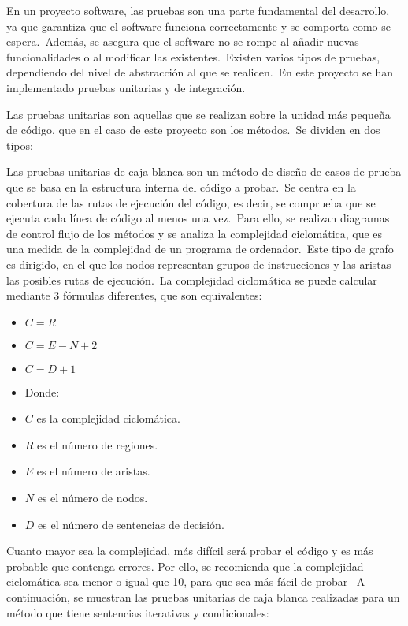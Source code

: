 
En un proyecto software, las pruebas son una parte fundamental del desarrollo, ya que garantiza que el software funciona
correctamente y se comporta como se espera.\ Además, se asegura que el software no se rompe al añadir nuevas
funcionalidades o al modificar las existentes.\ Existen varios tipos de pruebas, dependiendo del nivel de abstracción
al que se realicen.\ En este proyecto se han implementado pruebas unitarias y de integración.


Las pruebas unitarias son aquellas que se realizan sobre la unidad más pequeña de código, que en el caso de este
proyecto son los métodos.\ Se dividen en dos tipos:


Las pruebas unitarias de caja blanca son un método de diseño de casos de prueba que se basa en la estructura interna
del código a probar.\ Se centra en la cobertura de las rutas de ejecución del código, es decir, se comprueba que se
ejecuta cada línea de código al menos una vez.\ Para ello, se realizan diagramas de control flujo de los métodos y se
analiza la complejidad ciclomática, que es una medida de la complejidad de un programa de
ordenador.\ Este tipo de grafo es dirigido, en el que los
nodos representan grupos de instrucciones y las aristas las posibles rutas de ejecución.\ La complejidad ciclomática
se puede calcular mediante 3 fórmulas diferentes, que son equivalentes:

\begin{itemize}
	\item $C = R$
	\item $C = E - N + 2$
	\item $C = D + 1$
	\item Donde:
	\item $C$ es la complejidad ciclomática.
	\item $R$ es el número de regiones.
	\item $E$ es el número de aristas.
	\item $N$ es el número de nodos.
	\item $D$ es el número de sentencias de decisión.
\end{itemize}

Cuanto mayor sea la complejidad, más difícil será probar el código y es más probable que contenga errores.
Por ello, se recomienda que la complejidad ciclomática sea menor o igual que 10, para que sea más fácil de probar~\cite{Cyclomat84:online}
A continuación, se muestran las pruebas unitarias de caja blanca realizadas para un método que tiene sentencias
iterativas y condicionales:

